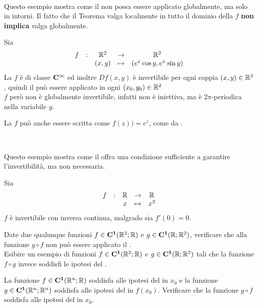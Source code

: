 \begin{example}~
	\label{ex:funz_inv_ma_non_iniett}
	\vspace*{-\baselineskip}
	\begin{note}
		Questo esempio mostra come il  non possa essere applicato globalmente, ma solo in intorni. Il fatto che il Teorema valga localmente in tutto il dominio della $f$ \textbf{non implica} valga globalmente.
	\end{note}
	Sia
	\[\begin{array}{ccccc} {f} & : & {\mathbb{R}^2} & \to & {\mathbb{R}^2} \\ & & {(x,y)} & \mapsto & {(e^x \cos y, e^x \sin y)} \\ \end{array}\]
	La $f$ è di classe $\mathbf{C^{\infty}}$ ed inoltre $Df(x,y)$ è invertibile per ogni coppia $(x,y) \in \mathbb{R}^2$, quindi il  può essere applicato in ogni $(x_0, y_0) \in \mathbb{R}^2$\\
	$f$ però non è globalmente invertibile, infatti non è iniettiva, ma è $2\pi$-periodica nella variabile $y$.
	\begin{note}
		La $f$ può anche essere scritta come $f(z)) = e^z$, come da \fullref{def:exp_complesso}.
	\end{note}
\end{example}
\begin{exercise}~
	\vspace*{-\baselineskip}
	\begin{note}
		Questo esempio mostra come il  offra una condizione sufficiente a garantire l'invertibilità, ma non necessaria.
	\end{note}
	Sia
	\[\begin{array}{ccccc} {f} & : & {\mathbb{R}} & \to & {\mathbb{R}} \\ & & {x} & \mapsto & {x^3} \\ \end{array}\]
	$f$ è invertibile con inversa continua, malgrado sia $f'(0) = 0$.
\end{exercise}
\begin{exercise}
	Date due qualunque funzioni $f \in \mathbf{C^{1}}(\mathbb{R}^2;\mathbb{R})$ e $g \in \mathbf{C^{1}}(\mathbb{R};\mathbb{R}^2)$, verificare che alla funzione $g \circ f$ non può essere applicato il .\\
	Esibire un esempio di funzioni $f \in \mathbf{C^{1}}(\mathbb{R}^2;\mathbb{R})$ e $g \in \mathbf{C^{1}}(\mathbb{R};\mathbb{R}^2)$ tali che la funzione $f \circ g$ invece soddisfi le ipotesi del .
\end{exercise}
\begin{exercise}
	La funzione $f \in \mathbf{C^{1}}(\mathbb{R}^n;\mathbb{R})$ soddisfa alle ipotesi del  in $x_0$ e la funzione $g \in \mathbf{C^{1}}(\mathbb{R}^n; \mathbb{R}^n)$ soddisfa alle ipotesi del  in $f(x_0)$. Verificare che la funzione $g \circ f$ soddisfa alle ipotesi del  in $x_0$.
\end{exercise}

